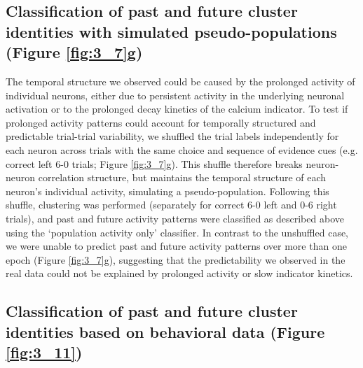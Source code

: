 \subsection[Classification of past and future cluster identities with simulated pseudo-populations ]{Classification of past and future cluster identities with simulated pseudo-populations (Figure \ref{fig:3_7}g)} \label{methods:clustering_pseudopop}

The temporal structure we observed could be caused by the prolonged activity of individual neurons, either due to persistent activity in the underlying neuronal activation or to the prolonged decay kinetics of the calcium indicator. To test if prolonged activity patterns could account for temporally structured and predictable trial-trial variability, we shuffled the trial labels independently for each neuron across trials with the same choice and sequence of evidence cues (e.g. correct left 6-0 trials; Figure \ref{fig:3_7}g). This shuffle therefore breaks neuron-neuron correlation structure, but maintains the temporal structure of each neuron’s individual activity, simulating a pseudo-population. Following this shuffle, clustering was performed (separately for correct 6-0 left and 0-6 right trials), and past and future activity patterns were classified as described above using the `population activity only' classifier. In contrast to the unshuffled case, we were unable to predict past and future activity patterns over more than one epoch (Figure \ref{fig:3_7}g), suggesting that the predictability we observed in the real data could not be explained by prolonged activity or slow indicator kinetics.


\subsection[Classification of past and future cluster identities based on behavioral data]{Classification of past and future cluster identities based on behavioral data (Figure \ref{fig:3_11})} \label{methods:clustering_behav_past_future}

